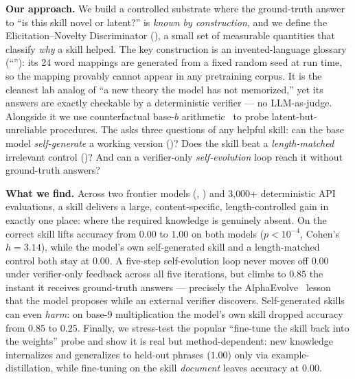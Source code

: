 {\bf Our approach.} We build a controlled substrate where the ground-truth answer to ``is this
skill novel or latent?'' is \emph{known by construction}, and we define the
Elicitation--Novelty Discriminator (\END), a small set of measurable quantities that classify
\emph{why} a skill helped. The key construction is an invented-language glossary (``\zeth''):
its 24 word mappings are generated from a fixed random seed at run time, so the mapping
provably cannot appear in any pretraining corpus. It is the cleanest lab analog of ``a new
theory the model has not memorized,'' yet its answers are exactly checkable by a deterministic
verifier --- no LLM-as-judge. Alongside it we use counterfactual base-$b$
arithmetic~\citep{reasoningreciting} to probe latent-but-unreliable procedures. The \END
asks three questions of any helpful skill: can the base model \emph{self-generate} a working
version (\SG)? Does the skill beat a \emph{length-matched} irrelevant control (\LCG)? And can a
verifier-only \emph{self-evolution} loop reach it without ground-truth answers?

{\bf What we find.} Across two frontier models (\claude, \gpt) and 3{,}000+ deterministic API
evaluations, a skill delivers a large, content-specific, length-controlled gain in exactly one
place: where the required knowledge is genuinely absent. On \zeth the correct skill lifts
accuracy from $0.00$ to $1.00$ on both models ($p<10^{-4}$, Cohen's $h=3.14$), while the
model's own self-generated skill and a length-matched control both stay at $0.00$. A
five-step self-evolution loop never moves \zeth off $0.00$ under verifier-only feedback across
all five iterations, but climbs to $0.85$ the instant it receives ground-truth answers ---
precisely the AlphaEvolve~\citep{alphaevolve} lesson that the model proposes while an external
verifier discovers. Self-generated skills can even \emph{harm}: on base-9 multiplication the
model's own skill dropped accuracy from $0.85$ to $0.25$. Finally, we stress-test the popular
``fine-tune the skill back into the weights'' probe and show it is real but method-dependent:
new knowledge internalizes and generalizes to held-out phrases ($1.00$) only via
example-distillation, while fine-tuning on the skill \emph{document} leaves accuracy at $0.00$.

